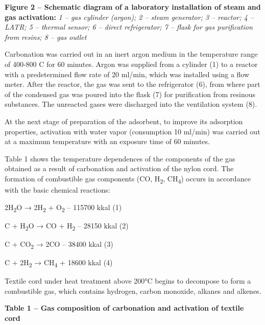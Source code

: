 \textbf{Figure 2 -- Schematic diagram of a laboratory installation of
steam and gas activation:} \emph{1 -- gas cylinder (argon); 2 -- steam
generator; 3 -- reactor; 4 -- LATR; 5 -- thermal sensor; 6 -- direct
refrigerator; 7 -- flask for gas purification from resins; 8 -- gas
outlet}

Carbonation was carried out in an inert argon medium in the temperature
range of 400-800 C for 60 minutes. Argon was supplied from a cylinder
(1) to a reactor with a predetermined flow rate of 20 ml/min, which was
installed using a flow meter. After the reactor, the gas was sent to the
refrigerator (6), from where part of the condensed gas was poured into
the flask (7) for purification from resinous substances. The unreacted
gases were discharged into the ventilation system (8).

At the next stage of preparation of the adsorbent, to improve its
adsorption properties, activation with water vapor (consumption 10
ml/min) was carried out at a maximum temperature with an exposure time
of 60 minutes.

Table 1 shows the temperature dependences of the components of the gas
obtained as a result of carbonation and activation of the nylon cord.
The formation of combustible gas components (CO, H\textsubscript{2},
CH\textsubscript{4}) occurs in accordance with the basic chemical
reactions:

2H\textsubscript{2}O → 2H\textsubscript{2} + O\textsubscript{2} --
115700 kkal (1)

C + H\textsubscript{2}O → CO + H\textsubscript{2} -- 28150 kkal (2)

C + CO\textsubscript{2} → 2CO -- 38400 kkal (3)

C + 2H\textsubscript{2} → CH\textsubscript{4} + 18600 kkal (4)

Textile cord under heat treatment above 200°C begins to decompose to
form a combustible gas, which contains hydrogen, carbon monoxide,
alkanes and alkenes.

\textbf{Table 1 -- Gas composition of carbonation and activation of
textile cord}

